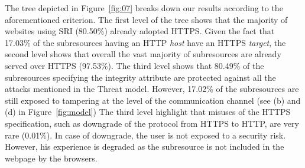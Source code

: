 \documentclass[sigconf,table]{acmart}
\begin{document}
The tree depicted in Figure~\ref{fig:07} breaks down our results according to the aforementioned criterion.
The first level of the tree shows that the majority of websites using SRI (\num{80.50}\%) already adopted HTTPS.
Given the fact that \num{17.03}\% of the subresources having an HTTP \textit{host} have an HTTPS  \textit{target}, the second level shows that overall the vast majority of subresources are already served over HTTPS (\num{97.53}\%).
The third level shows that \num{80.49}\% of the subresources specifying the integrity attribute are protected against all the attacks mentioned in the Threat model.
However, \num{17.02}\% of the subresources are still exposed to tampering at the level of the communication channel (see (b) and (d) in Figure~\ref{fig:model})
The third level highlight that misuses of the HTTPS specification, such as downgrade of the protocol from HTTPS to HTTP, are very rare (\num{0.01}\%).
In case of downgrade, the user is not exposed to a security risk. However, his experience is degraded as the subresource is not included in the webpage by the browsers.
\end{document}
